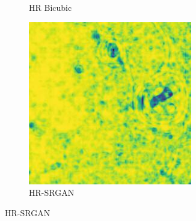 \begin{figure}[H]
\begin{subfigure}[H]{0.275\textwidth}
    \caption{HR Bicubic}
  \end{subfigure}
  \begin{subfigure}[H]{0.275\textwidth}
    \includegraphics[width=\textwidth]{Chapter7/SSIM_srgan_445.jpg}
    \caption{HR-SRGAN}
  \end{subfigure}
  

\end{figure}
